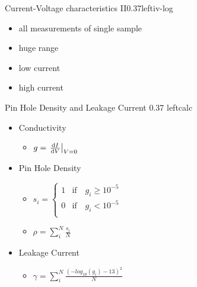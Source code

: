 \documentclass[hyperref={pdfpagelabels=false}, aspectratio=43, t]{beamer}  %
\begin{document}
\begin{graphicsFrame}{Current-Voltage characteristics II}{}{0.37}{left}{iv-log}{}
	\vspace{2em}
	\begin{itemize}
		\item all measurements of single sample
		\vspace{.5em}
		\item huge range 
		\vspace{.5em}
		\item low current
		\vspace{.5em}
		\item high current
	\end{itemize}
\end{graphicsFrame}

\begin{graphicsFrame}
	{Pin Hole Density and Leakage Current}
	{}{0.37}
	{left}{calc}{}
	\vspace{2em}
	\begin{itemize}
		\item Conductivity
			\begin{itemize}
				\item $
					g = \eval{\dv{I}{V}}_{V =0}
					$
			\end{itemize}
	\vspace{0.5em}
		\item Pin Hole Density 
			\begin{itemize}
				\item $
	s_i = \begin{cases}
		1 &\text{if} \quad g_i \geq 10^{-5} \\
		0 &\text{if} \quad g_i < 10^{-5} \\
	\end{cases}
					$
				\item $
	\rho = \sum_i^N \frac{s_i}{N}
					$
			\end{itemize}
	\vspace{0.5em}
		\item Leakage Current 
			\begin{itemize}
				\item $
    \gamma = \sum_i^N \frac{ (-log_{10}(g_i) - 13)^2}{N}
	$
			\end{itemize}
	\end{itemize}
\end{graphicsFrame}
\end{document}
